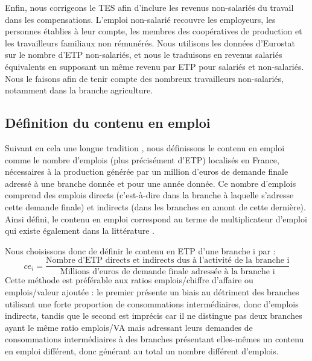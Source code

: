 Enfin, nous corrigeons le TES afin d’inclure les revenus non-salariés du travail dans les compensations. L'emploi non-salarié recouvre les employeurs, les personnes établies à leur compte, les membres des coopératives de production et les travailleurs familiaux non rémunérés. Nous utilisons les données d'Eurostat sur le nombre d'ETP non-salariés, et nous le traduisons en revenus salariés équivalents en supposant un même revenu par ETP pour salariés et non-salariés. Nous le faisons afin de tenir compte des nombreux travailleurs non-salariés, notamment dans la branche agriculture.

\subsection{Définition du contenu en emploi}
Suivant en cela une longue tradition \citep{Freyssinet1977, Husson1994}, nous définissons le contenu en emploi comme le nombre d’emplois (plus précisément d’ETP) localisés en France, nécessaires à la production générée par un million d’euros de demande finale adressé à une branche donnée et pour une année donnée. Ce nombre d’emplois comprend des emplois directs (c’est-à-dire dans la branche à laquelle s’adresse cette demande finale) et indirects (dans les branches en amont de cette dernière). Ainsi défini, le contenu en emploi correspond au terme de multiplicateur d’emploi qui existe également dans la littérature \citep{Miller2009}.

Nous choisissons donc de définir le contenu en ETP d’une branche i par :
\begin{equation}
ce_i= \frac{\text{Nombre d'ETP directs et indirects dus à l'activité de la branche i}}{\text{Millions d'euros de demande finale adressée à la branche i}}
\label{definition_ce}
\end{equation}
Cette méthode est préférable aux ratios emplois/chiffre d’affaire ou emplois/valeur ajoutée : le premier présente un biais au détriment des branches utilisant une forte proportion de consommations intermédiaires, donc d’emplois indirects, tandis que le second est imprécis car il ne distingue pas deux branches ayant le même ratio emplois/VA mais adressant leurs demandes de consommations intermédiaires à des branches présentant elles-mêmes un contenu en emploi différent, donc générant au total un nombre différent d’emplois.

